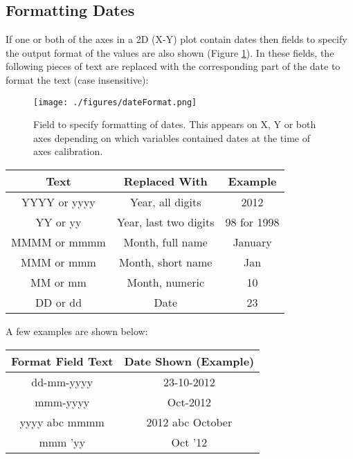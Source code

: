 \documentclass[letterpaper, 10pt]{article}
\begin{document}
\subsection{Formatting Dates}
\label{sec:formattingDatesCSV}
If one or both of the axes in a 2D (X-Y) plot contain dates then fields to specify the output format of the values are also shown (Figure \ref{fig:dateFormat}). In these fields, the following pieces of text are replaced with the corresponding part of the date to format the text (case insensitive):
\begin{figure}
\begin{center}
\texttt{[image: ./figures/dateFormat.png]}
\caption{Field to specify formatting of dates. This appears on X, Y or both axes depending on which variables contained dates at the time of axes calibration.}
\label{fig:dateFormat}
\end{center}
\end{figure}


\begin{center}
\begin{tabular}{|c|c|c|}
\hline
Text & Replaced With & Example\\
\hline
YYYY or yyyy & Year, all digits & 2012\\
YY or yy & Year, last two digits & 98 for 1998\\
MMMM or mmmm & Month, full name & January\\
MMM or mmm & Month, short name & Jan\\
MM or mm & Month, numeric & 10\\
DD or dd & Date & 23\\
\hline
\end{tabular}
\end{center}

A few examples are shown below:

\begin{center}
\begin{tabular}{|c|c|}
\hline
Format Field Text & Date Shown (Example)\\
\hline
dd-mm-yyyy & 23-10-2012\\
mmm-yyyy & Oct-2012\\
yyyy abc mmmm & 2012 abc October\\
mmm 'yy & Oct '12\\
\hline
\end{tabular}
\end{center}
\end{document}
